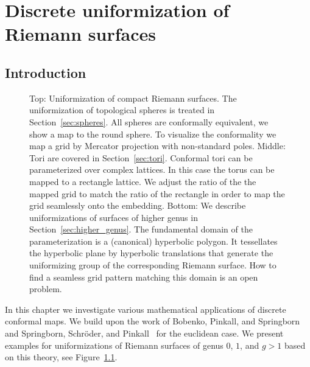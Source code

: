 \documentclass[Thesis]{subfiles}
\begin{document}

\chapter{Discrete uniformization of Riemann surfaces}
\label{chp:uniformization}

\section{Introduction}

\begin{figure}
\centering
{}
\caption{
Top: Uniformization of compact Riemann surfaces. 
The uniformization of topological spheres is treated in Section~\ref{sec:spheres}.
All spheres are conformally equivalent, we show a map to the round sphere. 
To visualize the conformality we map a grid by Mercator projection with non-standard poles.
Middle: Tori are covered in Section~\ref{sec:tori}.
Conformal tori can be parameterized over complex lattices. 
In this case the torus can be mapped to a rectangle lattice. 
We adjust the ratio of the the mapped grid to match the ratio of the rectangle in order to map the grid seamlessly onto the embedding.
Bottom: We describe uniformizations of surfaces of higher genus in Section~\ref{sec:higher_genus}.
The fundamental domain of the parameterization is a (canonical) hyperbolic polygon. 
It tessellates the hyperbolic plane by hyperbolic translations that generate the uniformizing group of the corresponding Riemann surface.
How to find a seamless grid pattern matching this domain is an open problem.
}
\label{fig:intro_uniformization}
\end{figure}

In this chapter we investigate various mathematical applications of discrete conformal maps. 
We build upon the work of Bobenko, Pinkall, and Springborn~\cite{Bobenko2010} and Springborn, Schr\"{o}der, and Pinkall~\cite{Springborn2008} for the euclidean case. We present examples for uniformizations of Riemann surfaces of genus $0$, $1$, and $g>1$ based on this theory, see Figure~\ref{fig:intro_uniformization}.
\end{document}
